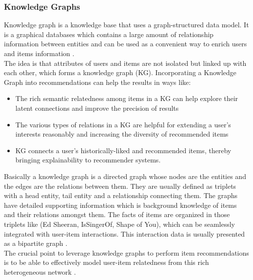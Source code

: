 \documentclass[\myFontSize,a4paper,oneside,english,hidelinks]{article}
\begin{document}
\subsubsection{Knowledge Graphs}
Knowledge graph is a knowledge base that uses a graph-structured data model. It is a graphical databases which contains a large amount of relationship information between entities and can be used as a convenient way to enrich users and items information \cite{Imene2022488}.\\
%
The idea is that attributes of users and items are not isolated but linked up with each other, which forms a knowledge graph (KG). Incorporating a Knowledge Graph into recommendations can help the results in ways like:
\begin{itemize}
\item The rich semantic relatedness among items in a KG can help explore their latent connections and improve the precision of results
\item The various types of relations in a KG are helpful for extending a user’s interests reasonably and increasing the diversity of recommended items
\item KG connects a user’s historically-liked and recommended items, thereby bringing explainability to recommender systems. \cite{Wang20193307}
\end{itemize}
%
Basically a knowledge graph is a directed graph whose nodes are the entities and the edges are the relations between them. They are usually defined as triplets with a head entity, tail entity and a relationship connecting them. The graphs have detailed supporting information which is background knowledge of items and their relations amongst them. The facts of items are organized in those triplets like (Ed Sheeran, IsSingerOf, Shape of You), which can be seamlessly integrated with user-item interactions. This interaction data is usually presented as a
bipartite graph \cite{pub.1120733877}. \\
The crucial point to leverage knowledge graphs to perform item recommendations is to be able to effectively model user-item relatedness from this rich heterogeneous network \cite{Palumbo201732}. \\ 
%
%
\end{document}
